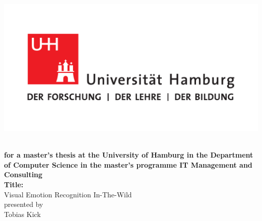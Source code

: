 \documentclass[11pt,a4paper]{scrbook}
\begin{document}
\frontmatter
{}
\begin{titlepage}
\includegraphics[scale=0.3]{UHH-Logo_2010_Farbe_CMYK.pdf}
\vspace*{1cm}
\Large
\begin{center}
{\color{uhhred}\textbf{}}
\vspace*{1.0cm}\\
{\textbf{for a master's thesis at the University of Hamburg in the Department of Computer Science in the master's programme IT Management and Consulting}}
\vspace*{2.0cm}\\
{\LARGE \textbf{Title:}}
\vspace*{0.4cm}\\
{\LARGE Visual Emotion Recognition In-The-Wild}
\vspace*{1.5cm}\\
presented by
\vspace*{0.4cm}\\
Tobias Kick
\end{center}
\vspace*{2.5cm}


\end{titlepage}
\end{document}
